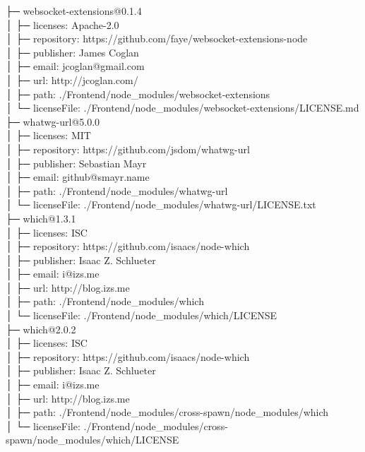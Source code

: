 \documentclass[
    paper=a4,
    twoside=false,
    parskip=half,
    listof=entryprefix,
    listof=totoc,
    index=totoc,
    bibliography=totoc,
    headsepline,
]{scrbook}
\begin{document}
    ├─ websocket-extensions@0.1.4\\
    │  ├─ licenses: Apache-2.0\\
    │  ├─ repository: https://github.com/faye/websocket-extensions-node\\
    │  ├─ publisher: James Coglan\\
    │  ├─ email: jcoglan@gmail.com\\
    │  ├─ url: http://jcoglan.com/\\
    │  ├─ path: ./Frontend/node\_modules/websocket-extensions\\
    │  └─ licenseFile: ./Frontend/node\_modules/websocket-extensions/LICENSE.md\\
    ├─ whatwg-url@5.0.0\\
    │  ├─ licenses: MIT\\
    │  ├─ repository: https://github.com/jsdom/whatwg-url\\
    │  ├─ publisher: Sebastian Mayr\\
    │  ├─ email: github@smayr.name\\
    │  ├─ path: ./Frontend/node\_modules/whatwg-url\\
    │  └─ licenseFile: ./Frontend/node\_modules/whatwg-url/LICENSE.txt\\
    ├─ which@1.3.1\\
    │  ├─ licenses: ISC\\
    │  ├─ repository: https://github.com/isaacs/node-which\\
    │  ├─ publisher: Isaac Z. Schlueter\\
    │  ├─ email: i@izs.me\\
    │  ├─ url: http://blog.izs.me\\
    │  ├─ path: ./Frontend/node\_modules/which\\
    │  └─ licenseFile: ./Frontend/node\_modules/which/LICENSE\\
    ├─ which@2.0.2\\
    │  ├─ licenses: ISC\\
    │  ├─ repository: https://github.com/isaacs/node-which\\
    │  ├─ publisher: Isaac Z. Schlueter\\
    │  ├─ email: i@izs.me\\
    │  ├─ url: http://blog.izs.me\\
    │  ├─ path: ./Frontend/node\_modules/cross-spawn/node\_modules/which\\
    │  └─ licenseFile: ./Frontend/node\_modules/cross-spawn/node\_modules/which/LICENSE\\
\end{document}

